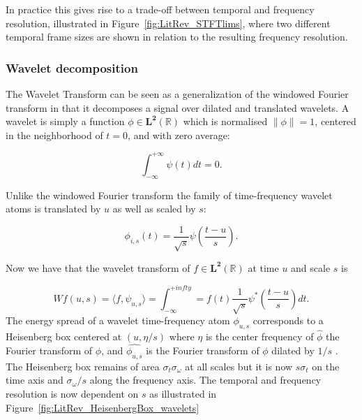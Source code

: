 In practice this gives rise to a trade-off between temporal and frequency resolution, illustrated in Figure~\ref{fig:LitRev_STFTlims}, where two different temporal frame sizes are shown in relation to the resulting frequency resolution.

\subsubsection{Wavelet decomposition}
The Wavelet Transform can be seen as a generalization of the windowed Fourier transform in that it decomposes a signal over dilated and translated wavelets. A wavelet is simply a function $\phi \in \mathbf{L^2}(\mathbb{R})$ which is normalised $\| \phi \| = 1$, centered in the neighborhood of $t=0$, and with zero average:

\begin{equation}\label{eq:Mallat1999_4}
\int^{+\infty}_{-\infty} \psi(t) dt = 0.
\end{equation}

Unlike the windowed Fourier transform the family of time-frequency wavelet atoms is translated by $u$ as well as scaled by $s$:

\begin{equation}\label{eq:Mallat1999_5}
\phi_{i,s}(t) = \frac{1}{\sqrt{s}}\psi\left(\frac{t-u}{s}\right).
\end{equation}

Now we have that the wavelet transform of $f \in \mathbf{L^2}(\mathbb{R})$ at time $u$ and scale $s$ is

\begin{equation}\label{eq:Mallat1999_x}
W f(u,s) = \langle f, \psi_{u,s} \rangle = \int^{+infty}_{-\infty} = f(t) \frac{1}{\sqrt{s}}\psi^\ast \left( \frac{t-u}{s} \right) dt.
\end{equation}
The energy spread of a wavelet time-frequency atom $\phi_{u,s}$ corresponds to a Heisenberg box centered at $(u,\eta/s)$ where $\eta$ is the center frequency of $\hat{\phi}$ the Fourier transform of $\phi$, and $\hat{\phi_{u,s}}$ is the Fourier transform of $\phi$ dilated by $1/s$ . The Heisenberg box remains of area $\sigma_t \sigma_\omega$ at all scales but it is now $s\sigma_t$ on the time axis and $\sigma_\omega /s$ along the frequency axis. The temporal and frequency resolution is now dependent on $s$ as illustrated in Figure~\ref{fig:LitRev_HeisenbergBox_wavelets}

